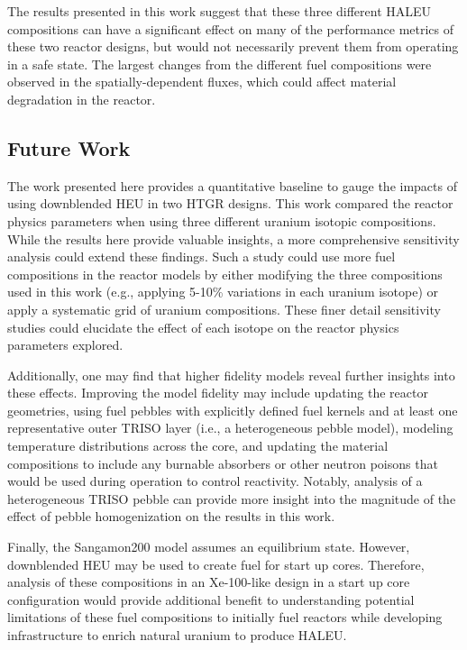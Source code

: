 The results presented in this work 
suggest that these three different \gls*{HALEU} compositions 
can have a significant effect on many of the performance metrics of these 
two reactor designs, but would not necessarily prevent them from operating in 
a safe state. The largest changes from the different fuel 
compositions were observed in the spatially-dependent fluxes, 
which could affect material degradation in the reactor. 


\subsection{Future Work}
The work presented here provides a quantitative baseline to 
gauge the impacts 
of using downblended \gls*{HEU} in two \gls*{HTGR} designs. 
This 
work compared the reactor physics parameters when using 
three different uranium isotopic compositions. While the 
results here provide valuable insights, a more comprehensive 
sensitivity analysis could extend these findings. Such 
a study could use more fuel compositions in the reactor 
models by either modifying the three compositions used 
in this work (e.g., applying 5-10\% variations in each 
uranium isotope) or apply a systematic grid of uranium 
compositions. These finer detail sensitivity studies 
could elucidate the effect of each isotope on the reactor 
physics parameters explored. 

Additionally, 
one may find that higher fidelity models reveal further insights into 
these effects. Improving the model fidelity may 
include updating the reactor geometries, using 
fuel pebbles with explicitly defined fuel kernels and at 
least one representative outer \gls*{TRISO} layer (i.e., a 
heterogeneous pebble model), 
modeling temperature distributions across the core, and 
updating the material compositions to include any 
burnable absorbers or other neutron poisons that would be 
used during operation to control reactivity. Notably, 
analysis of a heterogeneous \gls*{TRISO} pebble 
can provide more insight into the magnitude of the effect 
of pebble homogenization on the results in this work. 

Finally, the Sangamon200 model assumes an equilibrium state. 
However, downblended \gls*{HEU} may be used to create fuel for start up 
cores. Therefore, analysis of these compositions in an 
Xe-100-like 
design in a start up core configuration would provide 
additional benefit to  
understanding potential limitations of these fuel compositions 
to initially fuel reactors while developing infrastructure to 
enrich natural uranium to produce \gls*{HALEU}. 